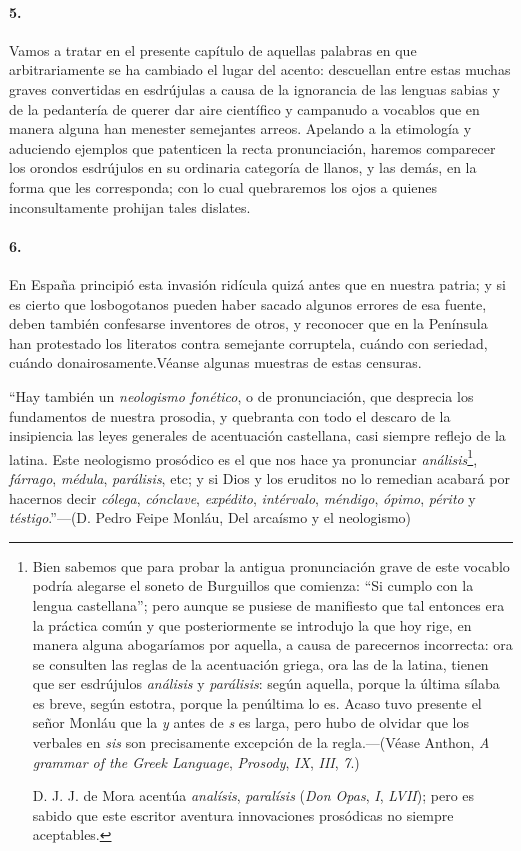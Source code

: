 \documentclass{book}
\begin{document}
\paragraph{5.} Vamos a tratar en el presente capítulo de aquellas palabras en que arbitrariamente se ha cambiado el lugar del acento: descuellan entre estas muchas graves convertidas en esdrújulas a causa de la ignorancia de las lenguas sabias y de la pedantería de querer dar aire científico y campanudo a vocablos que en manera alguna han menester semejantes arreos. Apelando a la etimología y aduciendo ejemplos que patenticen la recta pronunciación, haremos comparecer los orondos esdrújulos en su ordinaria categoría de llanos, y las demás, en la forma que les corresponda; con lo cual quebraremos los ojos a quienes inconsultamente prohijan tales dislates.

\paragraph{6.} En España principió esta invasión ridícula quizá antes que en nuestra patria; y si es cierto que losbogotanos pueden haber sacado algunos errores de esa fuente, deben también confesarse inventores de otros, y reconocer que en la Península han protestado los literatos contra semejante corruptela, cuándo con seriedad, cuándo donairosamente.Véanse algunas muestras de estas censuras.

``Hay también un \emph{neologismo fonético}, o de pronunciación, que desprecia los fundamentos de nuestra prosodia, y quebranta con todo el descaro de la insipiencia las leyes generales de acentuación castellana, casi siempre reflejo de la latina. Este neologismo prosódico es el que nos hace ya pronunciar \emph{análisis}\footnote{Bien sabemos que para probar la antigua pronunciación grave de este vocablo podría alegarse el soneto de Burguillos que comienza: ``Si cumplo con la lengua castellana''; pero aunque se pusiese de manifiesto que tal entonces era la práctica común y que posteriormente se introdujo la que hoy rige, en manera alguna abogaríamos por aquella, a causa de parecernos incorrecta: ora se consulten las reglas de la acentuación griega, ora las de la latina, tienen que ser esdrújulos \emph{análisis} y \emph{parálisis}: según aquella, porque la última sílaba es breve, según estotra, porque la penúltima lo es. Acaso tuvo presente el señor Monláu que la \emph{y} antes de \emph{s} es larga, pero hubo de olvidar que los verbales en \emph{sis} son precisamente excepción de la regla.---(Véase Anthon, \emph{A grammar of the Greek Language}, \emph{Prosody}, \emph{IX}, \emph{III}, \emph{7}.)

D. J. J. de Mora acentúa \emph{analísis}, \emph{paralísis} (\emph{Don Opas}, \emph{I}, \emph{LVII}); pero es sabido que este escritor aventura innovaciones prosódicas no siempre aceptables.}, \emph{fárrago}, \emph{médula}, \emph{parálisis}, etc; y si Dios y los eruditos no lo remedian acabará por hacernos decir \emph{cólega}, \emph{cónclave}, \emph{expédito}, \emph{intérvalo}, \emph{méndigo}, \emph{ópimo}, \emph{périto} y \emph{téstigo}.''---(D. Pedro Feipe Monláu, Del arcaísmo y el neologismo)
\end{document}
